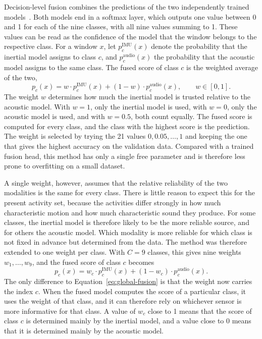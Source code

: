 Decision-level fusion combines the predictions of the two independently trained
models~\cite{alamin2019action}. Both models end in a softmax layer, which outputs one value
between 0 and 1 for each of the nine classes, with all nine values summing to 1.
These values can be read as the confidence of the model that the window belongs to
the respective class. For a window $x$, let $p^{\mathrm{IMU}}_c(x)$ denote the
probability that the inertial model assigns to class $c$, and
$p^{\mathrm{audio}}_c(x)$ the probability that the acoustic model assigns to the
same class. The fused score of class $c$ is the weighted average of the two,
\begin{equation}
  p_c(x) = w \cdot p^{\mathrm{IMU}}_c(x) + (1 - w) \cdot p^{\mathrm{audio}}_c(x),
  \qquad w \in [0, 1].
  \label{eq:global-fusion}
\end{equation}
The weight $w$ determines how much the inertial model is trusted relative to the
acoustic model. With $w = 1$, only the inertial model is used, with $w = 0$, only
the acoustic model is used, and with $w = 0.5$, both count equally. The fused
score is computed for every class, and the class with the highest score is the
prediction. The weight is selected by trying the 21 values $0, 0.05, \dots, 1$ and
keeping the one that gives the highest accuracy on the validation data. Compared
with a trained fusion head, this method has only a single free parameter and is
therefore less prone to overfitting on a small dataset.

A single weight, however, assumes that the relative reliability of the two
modalities is the same for every class. There is little reason to expect this for
the present activity set, because the activities differ strongly in how much
characteristic motion and how much characteristic sound they produce. For some
classes, the inertial model is therefore likely to be the more reliable source,
and for others the acoustic model. Which modality is more reliable for which class
is not fixed in advance but determined from the data. The method was therefore
extended to one weight per class. With $C = 9$ classes, this gives
nine weights $w_1, \dots, w_9$, and the fused score of class $c$ becomes
\begin{equation}
  p_c(x) = w_c \cdot p^{\mathrm{IMU}}_c(x) + (1 - w_c) \cdot p^{\mathrm{audio}}_c(x).
  \label{eq:perclass-fusion}
\end{equation}
The only difference to Equation~\ref{eq:global-fusion} is that the weight now
carries the index $c$. When the fused model computes the score of a particular
class, it uses the weight of that class, and it can therefore rely on whichever
sensor is more informative for that class. A value of $w_c$ close to 1 means that
the score of class $c$ is determined mainly by the inertial model, and a value
close to 0 means that it is determined mainly by the acoustic model.

